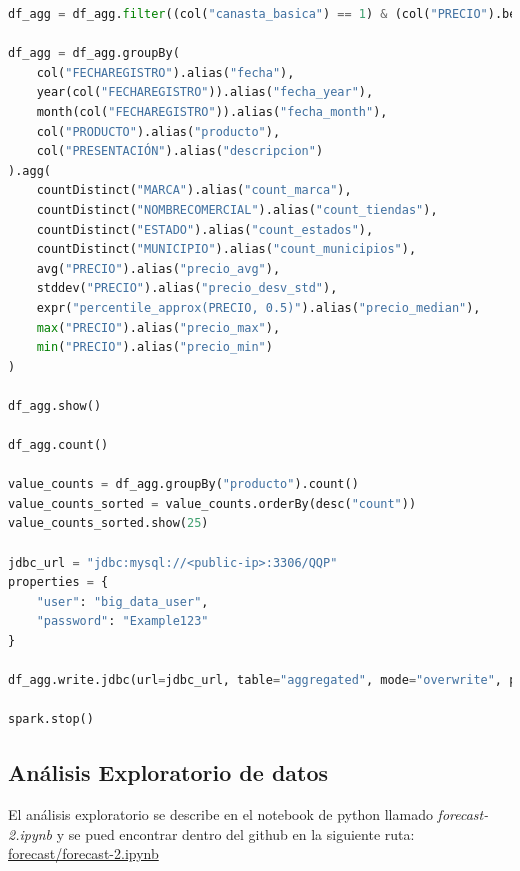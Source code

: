 \documentclass{article}
\begin{document}
\begin{lstlisting}[language=Python, caption={python version}]
df_agg = df_agg.filter((col("canasta_basica") == 1) & (col("PRECIO").between(5, 1000)))

df_agg = df_agg.groupBy(
    col("FECHAREGISTRO").alias("fecha"),
    year(col("FECHAREGISTRO")).alias("fecha_year"),
    month(col("FECHAREGISTRO")).alias("fecha_month"),
    col("PRODUCTO").alias("producto"),
    col("PRESENTACIÓN").alias("descripcion")
).agg(
    countDistinct("MARCA").alias("count_marca"),
    countDistinct("NOMBRECOMERCIAL").alias("count_tiendas"),
    countDistinct("ESTADO").alias("count_estados"),
    countDistinct("MUNICIPIO").alias("count_municipios"),
    avg("PRECIO").alias("precio_avg"),
    stddev("PRECIO").alias("precio_desv_std"),
    expr("percentile_approx(PRECIO, 0.5)").alias("precio_median"),
    max("PRECIO").alias("precio_max"),
    min("PRECIO").alias("precio_min")
)

df_agg.show()

df_agg.count()

value_counts = df_agg.groupBy("producto").count()
value_counts_sorted = value_counts.orderBy(desc("count"))
value_counts_sorted.show(25)

jdbc_url = "jdbc:mysql://<public-ip>:3306/QQP"
properties = {
    "user": "big_data_user",
    "password": "Example123"
}

df_agg.write.jdbc(url=jdbc_url, table="aggregated", mode="overwrite", properties=properties)

spark.stop()
\end{lstlisting}

\subsection{Análisis Exploratorio de datos}
El análisis exploratorio se describe en el notebook de python llamado \textit{forecast-2.ipynb} y se pued encontrar dentro del github en la siguiente ruta: \href{https://github.com/Anonymate054/MCD-BigData/blob/main/forecast/forecast-2.ipynb}{forecast/forecast-2.ipynb} 
\end{document}
